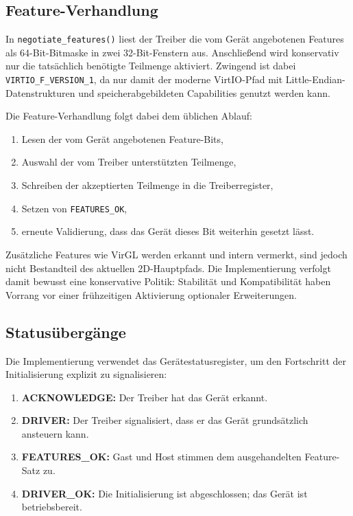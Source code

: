 \subsection{Feature-Verhandlung}
In \texttt{negotiate\_features()} liest der Treiber die vom Gerät angebotenen
Features als 64-Bit-Bitmaske in zwei 32-Bit-Fenstern aus. Anschließend wird
konservativ nur die tatsächlich benötigte Teilmenge aktiviert. Zwingend ist
dabei \texttt{VIRTIO\_F\_VERSION\_1}, da nur damit der moderne VirtIO-Pfad mit
Little-Endian-Datenstrukturen und speicherabgebildeten Capabilities genutzt
werden kann.

Die Feature-Verhandlung folgt dabei dem üblichen Ablauf:
\begin{enumerate}
    \item Lesen der vom Gerät angebotenen Feature-Bits,
    \item Auswahl der vom Treiber unterstützten Teilmenge,
    \item Schreiben der akzeptierten Teilmenge in die Treiberregister,
    \item Setzen von \texttt{FEATURES\_OK},
    \item erneute Validierung, dass das Gerät dieses Bit weiterhin gesetzt lässt.
\end{enumerate}

Zusätzliche Features wie VirGL werden erkannt und intern vermerkt, sind jedoch
nicht Bestandteil des aktuellen 2D-Hauptpfads. Die Implementierung verfolgt
damit bewusst eine konservative Politik: Stabilität und Kompatibilität haben
Vorrang vor einer frühzeitigen Aktivierung optionaler Erweiterungen.

\subsection{Statusübergänge}
Die Implementierung verwendet das Gerätestatusregister, um den Fortschritt der
Initialisierung explizit zu signalisieren:
\begin{enumerate}
    \item \textbf{ACKNOWLEDGE:} Der Treiber hat das Gerät erkannt.
    \item \textbf{DRIVER:} Der Treiber signalisiert, dass er das Gerät grundsätzlich ansteuern kann.
    \item \textbf{FEATURES\_OK:} Gast und Host stimmen dem ausgehandelten Feature-Satz zu.
    \item \textbf{DRIVER\_OK:} Die Initialisierung ist abgeschlossen; das Gerät ist betriebsbereit.
\end{enumerate}

